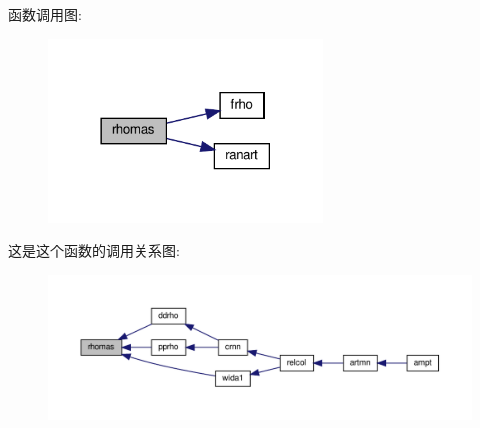 函数调用图\+:
\nopagebreak
\begin{figure}[H]
\begin{center}
\leavevmode
\includegraphics[width=206pt]{rhomas_8f90_a0eb545f9d6dbd369cb26a82f46ea7f02_cgraph}
\end{center}
\end{figure}
这是这个函数的调用关系图\+:
\nopagebreak
\begin{figure}[H]
\begin{center}
\leavevmode
\includegraphics[width=350pt]{rhomas_8f90_a0eb545f9d6dbd369cb26a82f46ea7f02_icgraph}
\end{center}
\end{figure}
